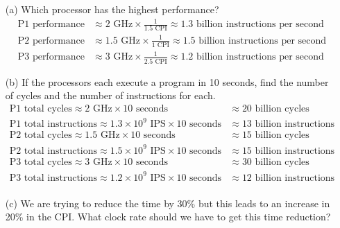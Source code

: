 \documentclass[12pt]{article}
\begin{document}
\begin{itemize}
\item[(a)] Which processor has the highest performance?
\begin{align*}
\text{P1 performance} &\approx 2\text{ GHz} \times \frac{1}{1.5 \text{ CPI}} \approx 1.3 \text{ billion instructions per second} \\
\text{P2 performance} &\approx 1.5\text{ GHz} \times \frac{1}{1 \text{ CPI}} \approx 1.5 \text{ billion instructions per second} \\
\text{P3 performance} &\approx 3\text{ GHz} \times \frac{1}{2.5 \text{ CPI}} \approx 1.2 \text{ billion instructions per second}
\end{align*}
\item[(b)] If the processors each execute a program in 10 seconds, find the number of cycles and the number of instructions for each.
\begin{align*}
\text{P1 total cycles} \approx 2 \text{ GHz} \times 10 \text{ seconds} &\approx 20 \text{ billion cycles} \\
\text{P1 total instructions} \approx 1.3 \times 10^{9} \text{ IPS} \times 10 \text{ seconds} &\approx 13 \text{ billion instructions} \\
\text{P2 total cycles} \approx 1.5 \text{ GHz} \times 10 \text{ seconds} &\approx 15 \text{ billion cycles} \\
\text{P2 total instructions} \approx 1.5 \times 10^{9} \text{ IPS} \times 10 \text{ seconds} &\approx 15 \text{ billion instructions} \\
\text{P3 total cycles} \approx 3 \text{ GHz} \times 10 \text{ seconds} &\approx 30 \text{ billion cycles} \\
\text{P3 total instructions} \approx 1.2 \times 10^{9} \text{ IPS} \times 10 \text{ seconds} &\approx 12 \text{ billion instructions} \\
\end{align*}
\item[(c)] We are trying to reduce the time by 30\% but this leads to an increase in 20\% in the CPI. What clock rate should we have to get this time reduction?
\end{itemize}
\end{document}
